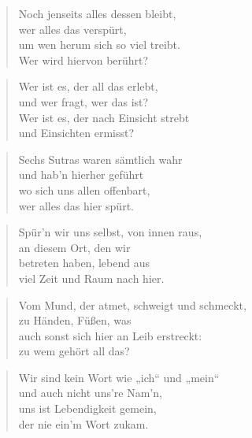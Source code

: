 \documentclass[10pt,a4paper]{article}
\begin{document}
\begin{paracol}{2}
\begin{verse}
Noch jenseits alles dessen bleibt, \\
wer alles das verspürt, \\
um wen herum sich so viel treibt. \\
Wer wird hiervon berührt? \\
\end{verse}

\begin{verse}
Wer ist es, der all das erlebt, \\
und wer fragt, wer das ist? \\
Wer ist es, der nach Einsicht strebt \\
und Einsichten ermisst? \\
\end{verse}

\begin{verse}
Sechs Sutras waren sämtlich wahr \\
und hab’n hierher geführt \\
wo sich uns allen offenbart, \\
wer alles das hier spürt. \\
\end{verse}

\begin{verse}
Spür’n wir uns selbst, von innen raus, \\
an diesem Ort, den wir \\
betreten haben, lebend aus \\
viel Zeit und Raum nach hier. \\
\end{verse}

\begin{verse}
Vom Mund, der atmet, schweigt und schmeckt, \\
zu Händen, Füßen, was \\
auch sonst sich hier an Leib erstreckt: \\
zu wem gehört all das? \\
\end{verse}

\begin{verse}
Wir sind kein Wort wie „ich“ und „mein“ \\
und auch nicht uns’re Nam’n, \\
uns ist Lebendigkeit gemein, \\
der nie ein’m Wort zukam. \\
\end{verse}


\end{paracol}
\end{document}
